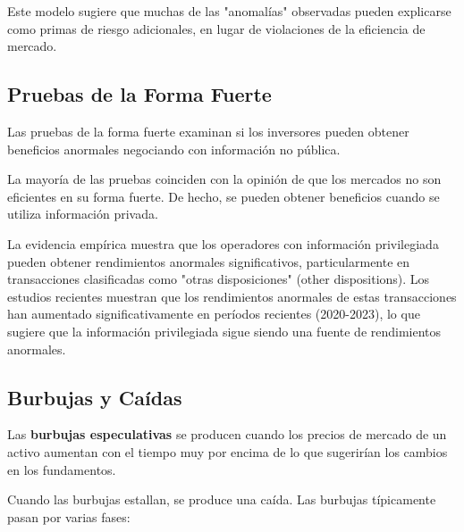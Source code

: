 Este modelo sugiere que muchas de las "anomalías" observadas pueden explicarse como primas de riesgo adicionales, en lugar de violaciones de la eficiencia de mercado.

\subsection{Pruebas de la Forma Fuerte}

Las pruebas de la forma fuerte examinan si los inversores pueden obtener beneficios anormales negociando con información no pública.

\begin{proposicion}
La mayoría de las pruebas coinciden con la opinión de que los mercados no son eficientes en su forma fuerte. De hecho, se pueden obtener beneficios cuando se utiliza información privada.
\end{proposicion}

La evidencia empírica muestra que los operadores con información privilegiada pueden obtener rendimientos anormales significativos, particularmente en transacciones clasificadas como "otras disposiciones" (other dispositions). Los estudios recientes muestran que los rendimientos anormales de estas transacciones han aumentado significativamente en períodos recientes (2020-2023), lo que sugiere que la información privilegiada sigue siendo una fuente de rendimientos anormales.

\subsection{Burbujas y Caídas}

\begin{definicion}
Las \textbf{burbujas especulativas} se producen cuando los precios de mercado de un activo aumentan con el tiempo muy por encima de lo que sugerirían los cambios en los fundamentos.
\end{definicion}

Cuando las burbujas estallan, se produce una caída. Las burbujas típicamente pasan por varias fases:

